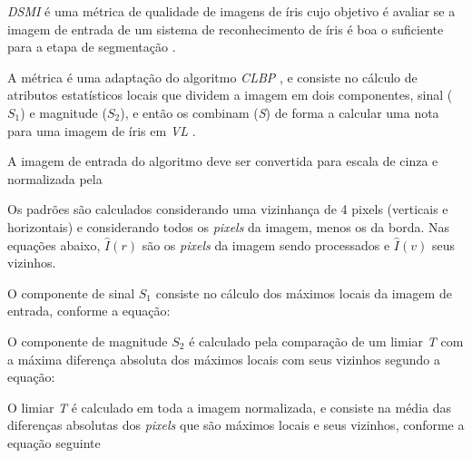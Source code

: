 \par \textit{\acrfull{DSMI}} é uma métrica de qualidade de imagens de íris cujo objetivo é avaliar se a imagem de entrada de um sistema de reconhecimento de íris é boa o suficiente para a etapa de segmentação \cite{Jenadeleh_2018_CVPR_Workshops}. 

\par A métrica é uma adaptação do algoritmo \textit{\acrfull{CLBP}} \cite{guo2010-CLBP}, e consiste no cálculo de atributos estatísticos locais que dividem a imagem em dois componentes, sinal ($S_{1}$) e magnitude ($S_{2}$), e então os combinam (\textit{S}) de forma a calcular uma nota para uma imagem de íris em \textit{\acrfull{VL}} \cite{Jenadeleh_2018_CVPR_Workshops}.

\par A imagem de entrada do algoritmo deve ser convertida para escala de cinza e normalizada pela 


\par Os padrões são calculados considerando uma vizinhança de 4 pixels (verticais e horizontais) e considerando todos os \textit{pixels} da imagem, menos os da borda. Nas equações abaixo, $\widehat{I}(r)$ são os \textit{pixels} da imagem sendo processados e $\widehat{I}(v)$ seus vizinhos.

\par O componente de sinal $S_{1}$ consiste no cálculo dos máximos locais da imagem de entrada, conforme a equação:


\par O componente de magnitude $S_{2}$ é calculado pela comparação de um limiar \textit{T} com a máxima diferença absoluta dos máximos locais com seus vizinhos segundo a equação:


\noindent O limiar \textit{T} é calculado em toda a imagem normalizada, e consiste na média das diferenças absolutas dos \textit{pixels} que são máximos locais e seus vizinhos, conforme a equação seguinte

